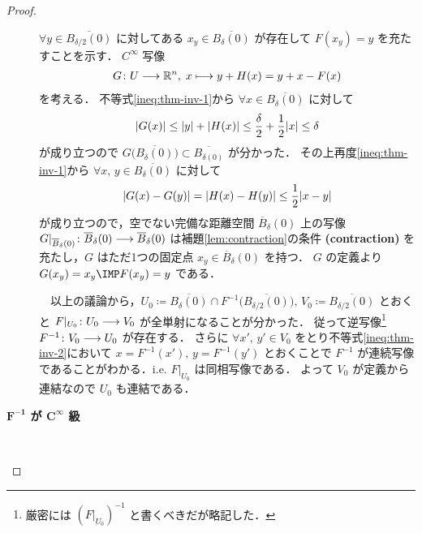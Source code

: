 \documentclass[geometry_main]{subfiles}
\begin{document}
\begin{proof}
\begin{description}
        $\forall y \in \overline{B_{\delta/2}(0)}$ に対してある $x_y \in \overline{B_\delta(0)}$ が存在して $F(x_y) = y$ を充たすことを示す．
        $C^\infty$ 写像
        \begin{align}
            G \colon U \longrightarrow \mathbb{R}^n,\; x \longmapsto y + H(x) = y + x - F(x)
        \end{align}
        を考える．
        不等式\eqref{ineq:thm-inv-1}から $\forall x \in \overline{B_\delta(0)}$ に対して
        \begin{align}
            \abs{G(x)} \le \abs{y} + \abs{H(x)} \le \frac{\delta}{2} + \frac{1}{2}\abs{x} \le \delta
        \end{align}
        が成り立つので $G \bigl( \overline{B_\delta(0)} \bigr) \subset \overline{B_{\delta(0)}}$ が分かった．
        その上再度\eqref{ineq:thm-inv-1}から $\forall x,\, y \in \overline{B_\delta(0)}$ に対して
        \begin{align}
            \abs{G(x) - G(y)} = \abs{H(x) - H(y)} \le \frac{1}{2} \abs{x - y}
        \end{align}
        が成り立つので，空でない完備な距離空間 $\overline{B}_\delta(0)$ 上の写像 $G|_{\overline{B}_\delta(0)} \colon \overline{B}_\delta(0) \longrightarrow \overline{B}_\delta(0)$ は補題\ref{lem:contraction}の条件 \textsf{\textbf{(contraction)}} を充たし，$G$ はただ1つの固定点 $x_y \in \overline{B}_\delta(0)$ を持つ．
        $G$ の定義より $G(x_y) = x_y \IMP F(x_y) = y$ である．

        　以上の議論から，$U_0 \coloneqq \overline{B_\delta(0)} \cap F^{-1}\bigl( \overline{B_{\delta/2}(0)} \bigr),\, V_0 \coloneqq \overline{B_{\delta/2}(0)}$ とおくと $F|_{U_0} \colon U_0 \longrightarrow V_0$ が全単射になることが分かった．
        従って逆写像\footnote{厳密には $(F|_{U_0})^{-1}$ と書くべきだが略記した．} $F^{-1} \colon V_0 \longrightarrow U_0$ が存在する．
        さらに $\forall x',\, y' \in V_0$ をとり不等式\eqref{ineq:thm-inv-2}において $x = F^{-1}(x'),\, y = F^{-1}(y')$ とおくことで $F^{-1}$ が連続写像であることがわかる．i.e. $F|_{U_0}$ は同相写像である．
        よって $V_0$ が定義から連結なので $U_0$ も連結である．

        \item[\textbf{$\bm{F^{-1}}$ が $\bm{C^\infty}$ 級}]　
        

\end{description}
\end{proof}
\end{document}
